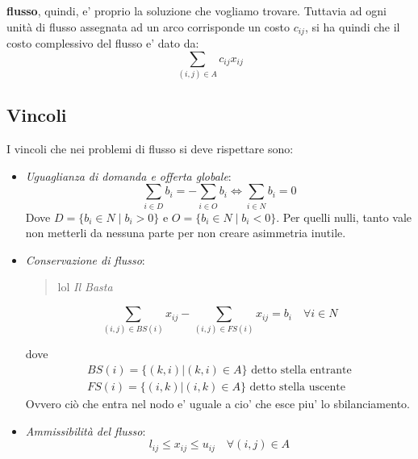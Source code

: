 \textbf{flusso}, quindi, e' proprio la soluzione che vogliamo trovare. Tuttavia ad ogni unità di flusso assegnata ad un arco corrisponde un costo $c_{ij}$, si ha quindi che il costo complessivo del flusso e' dato da:
\begin{equation}  
  \sum_{(i,j) \in A} c_{ij}x_{ij}
\end{equation}


\subsection{Vincoli}
I vincoli che nei problemi di flusso si deve rispettare sono:
\begin{itemize}
\item \textit{Uguaglianza di domanda e offerta globale}:
  \begin{equation}
    \sum_{i \in D}b_i = - \sum_{i \in O} b_i \iff \sum_{i \in N} b_i = 0
  \end{equation}
  Dove $ D = \{b_i \in N \mid b_i > 0\} $ e $ O = \{b_i \in N \mid b_i < 0\} $. Per quelli nulli, tanto vale non metterli da nessuna parte per non creare asimmetria inutile.
\item \textit{Conservazione di flusso}:
  \begin{quote}
    lol 
    \hfill \textit{Il Basta}
  \end{quote}

  \begin{equation}
    \sum_{(i,j) \in BS(i)} x_{ij} - \sum_{(i,j) \in FS(i)} x_{ij} = b_i \quad \forall i \in N
  \end{equation}
  
dove
\begin{align*}
  BS(i) = \{(k,i) | (k,i) \in A\} \text{ detto stella entrante}\\
  FS(i) = \{(i,k) | (i,k) \in A\} \text{ detto stella uscente}
\end{align*}
Ovvero ciò che entra nel nodo e' uguale a cio' che esce piu' lo sbilanciamento.
\item \textit{Ammissibilità del flusso}:
  \[
    l_{ij} \leq x_{ij} \leq u_{ij} \quad \forall (i,j) \in A
  \]
\end{itemize}



